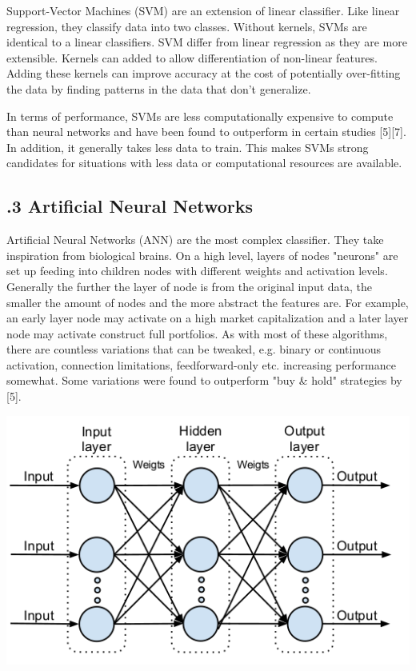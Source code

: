 \documentclass[12pt]{report}
\begin{document}
Support-Vector Machines (SVM) are an extension of linear classifier. Like linear regression, they classify data into two classes. Without kernels, SVMs are identical to a linear classifiers. SVM differ from linear regression as they are more extensible. Kernels can added to allow differentiation of non-linear features. Adding these kernels can improve accuracy at the cost of potentially over-fitting the data by finding patterns in the data that don't generalize.

In terms of performance, SVMs are less computationally expensive to compute than neural networks and have been found to outperform in certain studies [5][7]. In addition, it generally takes less data to train. This makes SVMs strong candidates for situations with less data or computational resources are available.

\subsection*{.3 Artificial Neural Networks}

Artificial Neural Networks (ANN) are the most complex classifier. They take inspiration from biological brains. On a high level, layers of nodes "neurons" are set up feeding into children nodes with different weights and activation levels. Generally the further the layer of node is from the original input data, the smaller the amount of nodes and the more abstract the features are. For example, an early layer node may activate on a high market capitalization and a later layer node may activate construct full portfolios. As with most of these algorithms, there are countless variations that can be tweaked, e.g. binary or continuous activation, connection limitations, feedforward-only etc. increasing performance somewhat. Some variations were found to outperform "buy \& hold" strategies by [5].

\begin{center}
\includegraphics[scale=0.5]{ANN}
\end{center}
\end{document}
